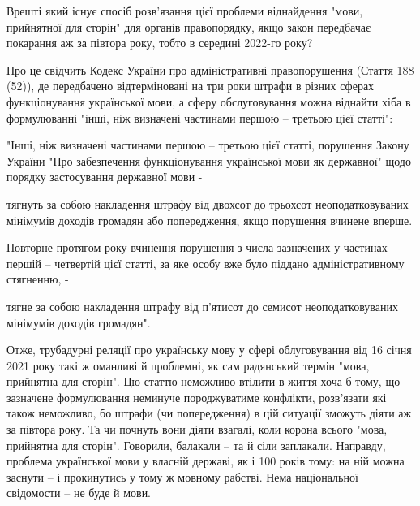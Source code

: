 Врешті який існує спосіб розв'язання цієї проблеми віднайдення "мови,
прийнятної для сторін" для органів правопорядку, якщо закон передбачає
покарання аж за півтора року, тобто в середині 2022-го року?

Про це свідчить Кодекс України про адміністративні правопорушення (Стаття 188
(52)), де передбачено відтерміновані на три роки штрафи в різних сферах
функціонування української мови, а сферу обслуговування можна віднайти хіба в
формулюванні "інші, ніж визначені частинами першою – третьою цієї статті":

"Інші, ніж визначені частинами першою – третьою цієї статті, порушення Закону
України "Про забезпечення функціонування української мови як державної" щодо
порядку застосування державної мови -

тягнуть за собою накладення штрафу від двохсот до трьохсот неоподатковуваних
мінімумів доходів громадян або попередження, якщо порушення вчинене вперше.

Повторне протягом року вчинення порушення з числа зазначених у частинах першій
– четвертій цієї статті, за яке особу вже було піддано адміністративному
стягненню, -

тягне за собою накладення штрафу від п'ятисот до семисот неоподатковуваних
мінімумів доходів громадян".

Отже, трубадурні реляції про українську мову у сфері облуговування від 16 січня
2021 року такі ж оманливі й проблемні, як сам радянський термін "мова,
прийнятна для сторін". Цю статтю неможливо втілити в життя хоча б тому, що
зазначене формулювання неминуче породжуватиме конфлікти, розв'язати які також
неможливо, бо штрафи (чи попередження) в цій ситуації зможуть діяти аж за
півтора року. Та чи почнуть вони діяти взагалі, коли корона всього "мова,
прийнятна для сторін". Говорили, балакали – та й сіли заплакали. Направду,
проблема української мови у власній державі, як і 100 років тому: на ній можна
заснути – і прокинутись у тому ж мовному рабстві. Нема національної свідомости
– не буде й мови.
